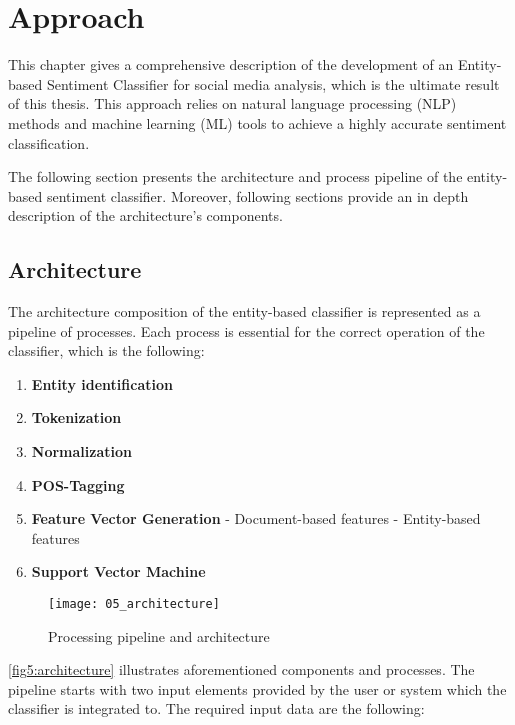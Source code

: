 
\chapter{Approach}
\label{sec:approach}

This chapter gives a comprehensive description of the development of an Entity-based Sentiment Classifier for social media analysis, which is the ultimate result of this thesis. This approach relies on natural language processing (NLP) methods and machine learning (ML) tools to achieve a highly accurate sentiment classification. 

The following section presents the architecture and process pipeline of the entity-based sentiment classifier. Moreover, following sections provide an in depth description of the architecture's components.

\section{Architecture}

The architecture composition of the entity-based classifier is represented as a pipeline of processes. Each process is essential for the correct operation of the classifier, which is the following: 

\begin{enumerate}
\itemsep0em 

\item \textbf{Entity identification}

\item \textbf{Tokenization}

\item \textbf{Normalization}

\item \textbf{POS-Tagging}

\item \textbf{Feature Vector Generation}
\subitem - Document-based features
\subitem - Entity-based features

\item \textbf{Support Vector Machine}

\end{enumerate}

\begin{figure}
    \centering
    \caption{Processing pipeline and architecture}
    \texttt{[image: 05\_architecture]}
    \label{fig5:architecture}
\end{figure}

\autoref{fig5:architecture} illustrates aforementioned components and processes. The pipeline starts with two input elements provided by the user or system which the classifier is integrated to. The required input data are the following:

